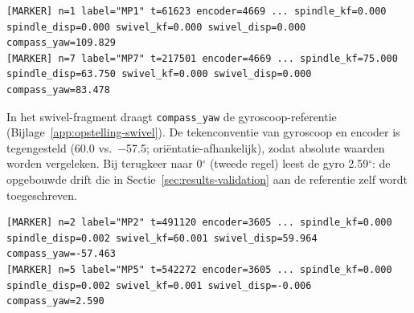 \documentclass[10pt, a4paper, twocolumn]{article}
\begin{document}
\begin{lstlisting}
[MARKER] n=1 label="MP1" t=61623 encoder=4669 ... spindle_kf=0.000 spindle_disp=0.000 swivel_kf=0.000 swivel_disp=0.000 compass_yaw=109.829
[MARKER] n=7 label="MP7" t=217501 encoder=4669 ... spindle_kf=75.000 spindle_disp=63.750 swivel_kf=0.000 swivel_disp=0.000 compass_yaw=83.478
\end{lstlisting}

In het swivel-fragment draagt \texttt{compass\_yaw} de gyroscoop-referentie
(Bijlage~\ref{app:opstelling-swivel}). De tekenconventie van gyroscoop en encoder is
tegengesteld (60.0 vs.\ $-$57.5; oriëntatie-afhankelijk), zodat absolute
waarden worden vergeleken. Bij terugkeer naar 0$^\circ$ (tweede regel) leest de
gyro 2.59$^\circ$: de opgebouwde drift die in
Sectie~\ref{sec:results-validation} aan de referentie zelf wordt toegeschreven.

\begin{lstlisting}
[MARKER] n=2 label="MP2" t=491120 encoder=3605 ... spindle_kf=0.000 spindle_disp=0.002 swivel_kf=60.001 swivel_disp=59.964 compass_yaw=-57.463
[MARKER] n=5 label="MP5" t=542272 encoder=3605 ... spindle_kf=0.000 spindle_disp=0.002 swivel_kf=0.001 swivel_disp=-0.006 compass_yaw=2.590
\end{lstlisting}

\label{LastPage}

\end{document}
